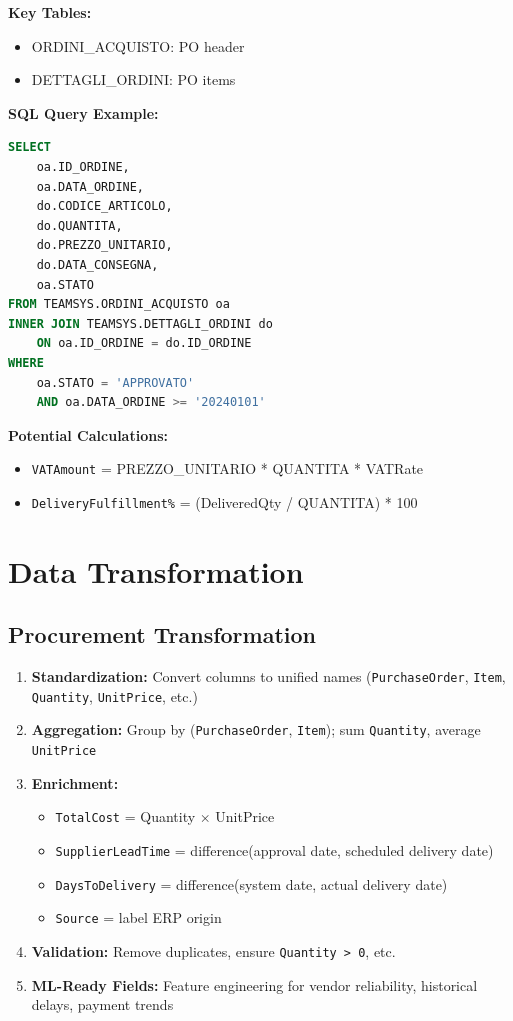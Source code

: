 \documentclass[a4paper,10pt]{article}
\begin{document}
\textbf{Key Tables:}
\begin{itemize}[leftmargin=2em]
    \item ORDINI\_ACQUISTO: PO header
    \item DETTAGLI\_ORDINI: PO items
\end{itemize}

\textbf{SQL Query Example:}
\begin{lstlisting}[language=SQL]
SELECT
    oa.ID_ORDINE,
    oa.DATA_ORDINE,
    do.CODICE_ARTICOLO,
    do.QUANTITA,
    do.PREZZO_UNITARIO,
    do.DATA_CONSEGNA,
    oa.STATO
FROM TEAMSYS.ORDINI_ACQUISTO oa
INNER JOIN TEAMSYS.DETTAGLI_ORDINI do
    ON oa.ID_ORDINE = do.ID_ORDINE
WHERE
    oa.STATO = 'APPROVATO'
    AND oa.DATA_ORDINE >= '20240101'
\end{lstlisting}

\textbf{Potential Calculations:}
\begin{itemize}[leftmargin=2em]
    \item \texttt{VATAmount} = PREZZO\_UNITARIO * QUANTITA * VATRate
    \item \texttt{DeliveryFulfillment\%} = (DeliveredQty / QUANTITA) * 100
\end{itemize}

\chapter{Data Transformation}

\section{Procurement Transformation}
\begin{enumerate}[leftmargin=2em]
    \item \textbf{Standardization:} Convert columns to unified names (\texttt{PurchaseOrder}, \texttt{Item}, \texttt{Quantity}, \texttt{UnitPrice}, etc.)
    \item \textbf{Aggregation:} Group by (\texttt{PurchaseOrder}, \texttt{Item}); sum \texttt{Quantity}, average \texttt{UnitPrice}
    \item \textbf{Enrichment:}
    \begin{itemize}[leftmargin=1.5em]
        \item \texttt{TotalCost} = Quantity $\times$ UnitPrice
        \item \texttt{SupplierLeadTime} = difference(approval date, scheduled delivery date)
        \item \texttt{DaysToDelivery} = difference(system date, actual delivery date)
        \item \texttt{Source} = label ERP origin
    \end{itemize}
    \item \textbf{Validation:} Remove duplicates, ensure \texttt{Quantity > 0}, etc.
    \item \textbf{ML-Ready Fields:} Feature engineering for vendor reliability, historical delays, payment trends
\end{enumerate}
\end{document}
